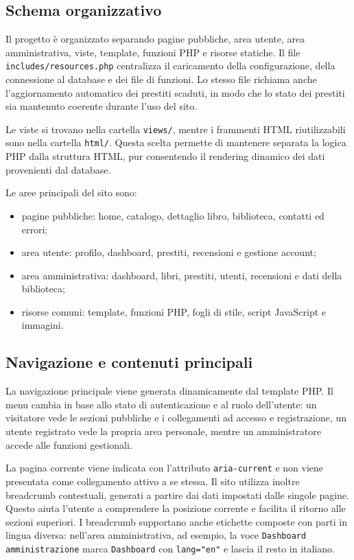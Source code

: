 ﻿\documentclass{article}
\begin{document}
\subsection{Schema organizzativo}
Il progetto è organizzato separando pagine pubbliche, area utente, area amministrativa, viste, template, funzioni PHP e risorse statiche. Il file \texttt{includes/resources.php} centralizza il caricamento della configurazione, della connessione al database e dei file di funzioni. Lo stesso file richiama anche l'aggiornamento automatico dei prestiti scaduti, in modo che lo stato dei prestiti sia mantenuto coerente durante l'uso del sito.

Le viste si trovano nella cartella \texttt{views/}, mentre i frammenti HTML riutilizzabili sono nella cartella \texttt{html/}. Questa scelta permette di mantenere separata la logica PHP dalla struttura HTML, pur consentendo il rendering dinamico dei dati provenienti dal database.

Le aree principali del sito sono:

\begin{itemize}
    \item pagine pubbliche: home, catalogo, dettaglio libro, biblioteca, contatti ed errori;
    \item area utente: profilo, dashboard, prestiti, recensioni e gestione account;
    \item area amministrativa: dashboard, libri, prestiti, utenti, recensioni e dati della biblioteca;
    \item risorse comuni: template, funzioni PHP, fogli di stile, script JavaScript e immagini.
\end{itemize}

\subsection{Navigazione e contenuti principali}
La navigazione principale viene generata dinamicamente dal template PHP. Il menu cambia in base allo stato di autenticazione e al ruolo dell'utente: un visitatore vede le sezioni pubbliche e i collegamenti ad accesso e registrazione, un utente registrato vede la propria area personale, mentre un amministratore accede alle funzioni gestionali.

La pagina corrente viene indicata con l'attributo \texttt{aria-current} e non viene presentata come collegamento attivo a se stessa. Il sito utilizza inoltre breadcrumb contestuali, generati a partire dai dati impostati dalle singole pagine. Questo aiuta l'utente a comprendere la posizione corrente e facilita il ritorno alle sezioni superiori. I breadcrumb supportano anche etichette composte con parti in lingua diversa: nell'area amministrativa, ad esempio, la voce \texttt{Dashboard amministrazione} marca \texttt{Dashboard} con \texttt{lang="en"} e lascia il resto in italiano.
\end{document}
